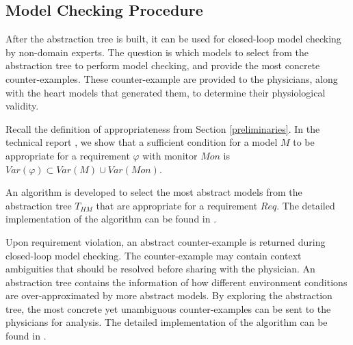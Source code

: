 \subsection{Model Checking Procedure}
After the abstraction tree is built, it can be used for closed-loop model checking by non-domain experts. 
The question is which models to select from the abstraction tree to perform model checking, and provide the most concrete counter-examples.
These counter-example are provided to the physicians, along with the heart models that generated them, to determine their physiological validity.

Recall the definition of appropriateness from Section \ref{preliminaries}.
In the technical report \cite{regar_tech}, we show that a sufficient condition for a model $M$ to be appropriate for a requirement $\varphi$ with monitor $Mon$ is
$Var(\varphi) \subset Var(M) \cup Var(Mon)$.

An algorithm is developed to select the most abstract models from the abstraction tree $T_{HM}$ that are appropriate for a requirement $Req$. The detailed implementation of the algorithm can be found in \cite{regar_tech}.

Upon requirement violation, an abstract counter-example is returned during closed-loop model checking. The counter-example may contain context ambiguities that should be resolved before sharing with the physician. An abstraction tree contains the information of how different environment conditions are over-approximated by more abstract models. By exploring the abstraction tree, the most concrete yet unambiguous counter-examples can be sent to the physicians for analysis. The detailed implementation of the algorithm can be found in \cite{regar_tech}.%


